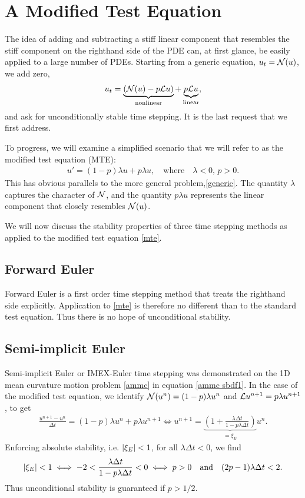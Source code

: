 \section{A Modified Test Equation}
The idea of adding and subtracting a stiff linear component that resembles the stiff component on the righthand side of the PDE can, at first glance, be easily applied to a large number of PDEs. Starting from a generic equation, $u_t = \mathcal{N}(u)$, we add zero,
\begin{align}
u_t = \underbrace{ (\mathcal{N}(u) - p\mathcal{L} u)}_\text{nonlinear} + \underbrace{p\mathcal{L} u}_\text{linear},
\label{generic} 
\end{align}
and ask for unconditionally stable time stepping. It is the last request that we first address.

To progress, we will examine a simplified scenario that we will refer to as the modified test equation (MTE): 
\begin{align}
u' = (1-p)\lambda u + p\lambda u,
\quad\text{where}\quad \lambda < 0\text{, } p>0.
\label{mte}
\end{align}
This has obvious parallels to the more general problem,\eqref{generic}. The quantity $\lambda$ captures the character of $\mathcal{N}$, and the quantity $p\lambda u$ represents the linear component that closely resembles $\mathcal{N}(u)$. 

We will now discuss the stability properties of three time stepping methods as applied to the modified test equation \eqref{mte}.

\subsection{Forward Euler}
Forward Euler is a first order time stepping method that treats the righthand side explicitly. Application to \eqref{mte} is therefore no different than to the standard test equation. Thus there is no hope of unconditional stability.

\subsection{Semi-implicit Euler}
Semi-implicit Euler \cite{smereka2003semi} or IMEX-Euler \cite{ascher1995implicit} time stepping was demonstrated on the 1D mean curvature motion problem \eqref{ammc} in equation \eqref{ammc sbdf1}. In the case of the modified test equation, we identify $\mathcal{N}(u^n) = (1-p)\lambda u^n$ and $\mathcal{L} u^{n+1} = p\lambda u^{n+1}$, to get 
\begin{align}
\frac{u^{n+1} - u^n}{\Delta t} 
= (1-p)\lambda u^n + p\lambda u^{n+1} 
\iff 
u^{n+1} 
= \underbrace{\left(1 + \frac{\lambda \Delta t}{1 - p\lambda\Delta t} \right)}_{=\xi_E} u^n.
\end{align}
Enforcing absolute stability, i.e. $\left|\xi_E\right| < 1$, for all $\lambda\Delta t < 0$, we find 
\begin{align}
\left|\xi_E\right| < 1 \iff 
-2 < \frac{\lambda\Delta t}{1 - p\lambda\Delta t} < 0
\iff p > 0 \quad\text{and}\quad (2p-1)\lambda\Delta t < 2.
\end{align}
Thus unconditional stability is guaranteed if $p > 1/2$.

